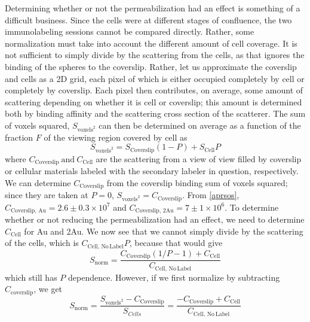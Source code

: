 Determining whether or not the permeabilization had an effect is something of a difficult business. Since the cells were at different stages of confluence, the two immunolabeling sessions cannot be compared directly. Rather, some normalization must take into account the different amount of cell coverage. It is not sufficient to simply divide by the scattering from the cells, as that ignores the binding of the spheres to the coverslip. Rather, let us approximate the coverslip and cells as a 2D grid, each pixel of which is either occupied completely by cell or completely by coverslip. Each pixel then contributes, on average, some amount of scattering depending on whether it is cell or coverslip; this amount is determined both by binding affinity and the scattering cross section of the scatterer. The sum of voxels squared, $S_{\mathrm{voxels}^2}$ can then be determined on average as a function of the fraction $F$ of the viewing region covered by cell as
\[S_{\mathrm{voxels}^2}=S_{\mathrm{Coverslip}}(1-P)+S_{\mathrm{Cell}}P\]
where $C_{\mathrm{Coverslip}}\mathrm{\ and\ }C_{\mathrm{Cell}}$ are the scattering from a view of view filled by coverslip or cellular materials labeled with the secondary labeler in question, respectively. We can determine $C_{\mathrm{Coverslip}}$ from the coverslip binding sum of voxels squared; since they are taken at $P=0$, $S_{\mathrm{voxels}^2}=C_{\mathrm{Coverslip}}$. From \autoref{aprsos}, $C_{\mathrm{Coverslip,\,Au}}=2.6\pm0.3\times10^7$ and $C_{\mathrm{Coverslip,\,2Au}}=7\pm1\times10^6$. To determine whether or not reducing the permeabilization had an effect, we need to determine $C_{\mathrm{Cell}}$ for Au and 2Au. We now see that we cannot simply divide by the scattering of the cells, which is $C_{\mathrm{Cell,\,No\, Label}}P$, because that would give
\[S_{\mathrm{norm}}=\frac{C_{\mathrm{Coverslip}}(1/P-1)+C_{\mathrm{Cell}}}{C_{\mathrm{Cell,\,No\, Label}}}\]
which still has $P$ dependence. However, if we first normalize by subtracting $C_{\mathrm{coverslip}}$, we get
\begin{equation}
S_{\mathrm{norm}}=\frac{S_{\mathrm{voxels}^2}-C_{\mathrm{Coverslip}}}{S_{Cells}}=\frac{-C_{\mathrm{Coverslip}}+C_{\mathrm{Cell}}}{C_{\mathrm{Cell,\,No\, Label}}}
\label{eq:normalization}
\end{equation}
